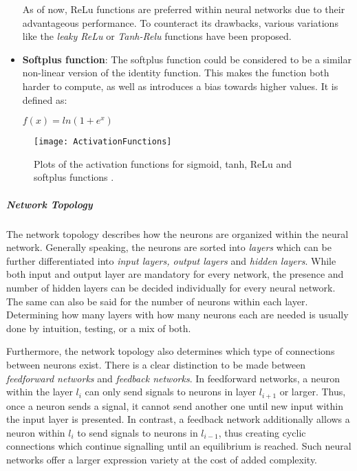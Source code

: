 \documentclass[draft,final]{vutinfth} %
\begin{document}
\begin{itemize}
As of now, ReLu functions are preferred within neural networks due to their advantageous performance. To counteract its drawbacks, various variations like the \emph{leaky ReLu} or \emph{Tanh-Relu} functions have been proposed.

\item \textbf{Softplus function}: The softplus function could be considered to be a similar non-linear version of the identity function. This makes the function both harder to compute, as well as introduces a bias towards higher values. It is defined as:
\begin{center}
$f(x)=ln(1+e^x)$
\end{center} 

\end{itemize}
\begin{figure}
\begin{center}
\texttt{[image: ActivationFunctions]}
\end{center}
\caption{Plots of the activation functions for sigmoid, tanh, ReLu and softplus functions \cite{wang2020influence}.}
\end{figure}
\subparagraph{Network Topology} The network topology describes how the neurons are organized within the neural network. Generally speaking, the neurons are sorted into \emph{layers} which can be further differentiated into \emph{input layers, output layers} and \emph{hidden layers}. While both input and output layer are mandatory for every network, the presence and number of hidden layers can be decided individually for every neural network. The same can also be said for the number of neurons within each layer. Determining how many layers with how many neurons each are needed is usually done by intuition, testing, or a mix of both.

Furthermore, the network topology also  determines which type of connections between neurons exist. There is a clear distinction to be made between \emph{feedforward networks} and \emph{feedback networks}. In feedforward networks, a neuron within the layer $l_i$ can only send signals to neurons in layer $l_{i+1}$ or larger. Thus, once a neuron sends a signal, it cannot send another one until new input within the input layer is presented.
In contrast, a feedback network additionally allows a neuron within $l_i$ to send signals to neurons in $l_{i-1}$, thus creating cyclic connections which continue signalling until an equilibrium is reached. Such neural networks offer a larger expression variety at the cost of added complexity.
\end{document}
